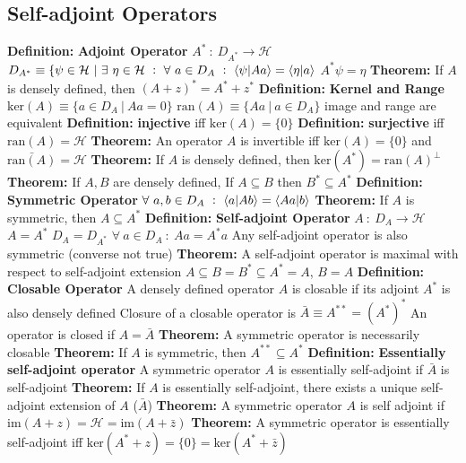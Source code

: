 \documentclass[14pt]{extarticle}
\def\Definition{{\color{blue} \textbf{Definition:} }}
\def\Theorem{{\color{red} \textbf{Theorem:} }}
\begin{document}
\begin{outline}
	\section*{Self-adjoint Operators}
		\1	\Definition \textbf{Adjoint Operator}
			\2	$A^*~:~D_{A^*} \rightarrow \mathcal{H}$
			\2	$D_{A^*} \equiv \{\psi \in \mathcal{H}~|~\exists~\eta \in \mathcal{H}~:~
					\forall~a \in D_{A}~:~\braket{\psi}{Aa} = \braket{\eta}{a}$
			\2	$A^*\psi = \eta$
		\1	\Theorem If $A$ is densely defined, then $(A + z)^* = A^* + z^*$
		\1	\Definition \textbf{Kernel and Range}
			\2	$\text{ker}(A) \equiv \{a \in D_A~|~Aa = 0\}$
			\2	$\text{ran}(A) \equiv \{Aa~|~a \in D_A\}$
			\2	image and range are equivalent
			\2	\Definition \textbf{injective}
				\3 iff $\text{ker}(A) = \{0\}$
			\2	\Definition \textbf{surjective}
				\3	iff $\text{ran}(A) = \mathcal{H}$
		\1	\Theorem	An operator $A$ is invertible iff $\text{ker}(A) = \{0\}$ and
				$\bar{\text{ran}(A)} = \mathcal{H}$
		\1	\Theorem If $A$ is densely defined, then $\text{ker}(A^*) = \text{ran}(A)^{\bot}$
		\1	\Theorem If $A,B$ are densely defined, If $A \subseteq B$ then
				$B^* \subseteq A^*$
		\1	\Definition \textbf{Symmetric Operator}
			\2	$\forall~a,b \in D_A~:~\braket{a}{Ab} = \braket{Aa}{b}$
		\1	\Theorem If $A$ is symmetric, then $A \subseteq A^*$
		\1	\Definition \textbf{Self-adjoint Operator}
			\2	$A~:~D_A \rightarrow \mathcal{H}$
			\2	$A = A^*$
			\2	$D_A = D_{A^*}$
			\2	$\forall~a \in D_A~:~Aa = A^*a$
			\2	Any self-adjoint operator is also symmetric (converse not true)
		\1	\Theorem A self-adjoint operator is maximal with respect to self-adjoint
				extension
			\2	$A \subseteq B = B^* \subseteq A^* = A$, $B = A$
		\1	\Definition \textbf{Closable Operator}
			\2	A densely defined operator $A$ is closable if its adjoint $A^*$ is also
					densely defined
			\2	Closure of a closable operator is $\bar{A} \equiv A^{**} = (A^*)^*$
			\2	An operator is closed if $A = \bar{A}$
		\1	\Theorem A symmetric operator is necessarily closable
		\1	\Theorem If $A$ is symmetric, then $A^{**} \subseteq A^*$
		\1	\Definition \textbf{Essentially self-adjoint operator}
			\2	A symmetric operator $A$ is essentially self-adjoint if 
					$\bar{A}$ is self-adjoint
		\1	\Theorem If $A$ is essentially self-adjoint, there exists a unique
				self-adjoint extension of $A$ ($\bar{A}$)
		\1	\Theorem A symmetric operator $A$ is self adjoint if
				$\text{im}(A + z) = \mathcal{H} = \text{im}(A + \bar{z})$
		\1	\Theorem A symmetric operator is essentially self-adjoint iff
				$\text{ker}(A^* + z) = \{0\} = \text{ker}(A^* + \bar{z})$
	

\end{outline}
\end{document}
